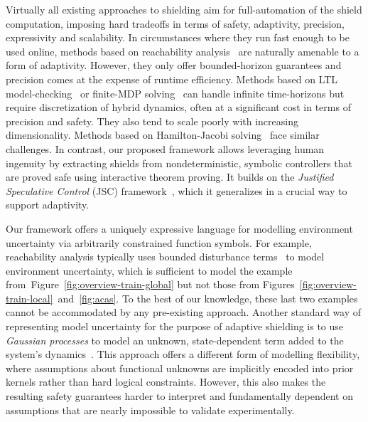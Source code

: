 \documentclass[acmsmall,screen,nonacm]{acmart}
\begin{document}
Virtually all existing approaches to shielding aim for full-automation of the shield computation, imposing hard tradeoffs in terms of safety, adaptivity, precision, expressivity and scalability. In circumstances where they run fast enough to be used online, methods based on reachability analysis~\cite{DBLP:conf/icra/ThummA22,DBLP:conf/cdc/KollerBT018,ivanov2019verisig} are naturally amenable to a form of adaptivity. However, they only offer bounded-horizon guarantees and precision comes at the expense of runtime efficiency. Methods based on LTL model-checking~\cite{DBLP:conf/aaai/AlshiekhBEKNT18,DBLP:conf/isola/KonighoferL0B20} or finite-MDP solving~\cite{pranger2021adaptive} can handle infinite time-horizons but require discretization of hybrid dynamics, often at a significant cost in terms of precision and safety. They also tend to scale poorly with increasing dimensionality. Methods based on Hamilton-Jacobi solving~\cite{DBLP:journals/tac/FisacAZKGT19} face similar challenges. In contrast, our proposed framework allows leveraging human ingenuity by extracting shields from nondeterministic, symbolic controllers that are proved safe using interactive theorem proving. It builds on the \emph{Justified Speculative Control} (JSC) framework~\cite{DBLP:conf/aaai/FultonP18}, which it generalizes in a crucial way to support adaptivity.

Our framework offers a uniquely expressive language for modelling environment uncertainty via arbitrarily constrained function symbols. For example, reachability analysis typically uses {bounded disturbance terms}~\cite{althoff2014online} to model environment uncertainty, which is sufficient to model the example from~Figure~\ref{fig:overview-train-global} but not those from Figures~\ref{fig:overview-train-local}~and~\ref{fig:acas}. To the best of our knowledge, these last two examples cannot be accommodated by any pre-existing approach. Another standard way of representing model uncertainty for the purpose of adaptive shielding is to use \emph{Gaussian processes} to model an unknown, state-dependent term added to the system's dynamics~\cite{DBLP:conf/aaai/ChengOMB19,DBLP:conf/eucc/BerkenkampS15,DBLP:conf/nips/BerkenkampTS017,DBLP:journals/tac/FisacAZKGT19}. This approach offers a different form of modelling flexibility, where assumptions about functional unknowns are implicitly encoded into prior kernels rather than hard logical constraints. However, this also makes the resulting safety guarantees harder to interpret and fundamentally dependent on assumptions that are nearly impossible to validate experimentally.
\end{document}
